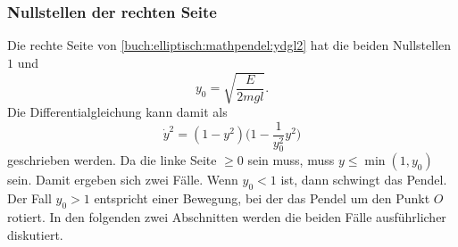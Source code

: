 \subsubsection{Nullstellen der rechten Seite}
Die rechte Seite von \eqref{buch:elliptisch:mathpendel:ydgl2}
hat die beiden Nullstellen $1$ und
\begin{equation}
y_0=\sqrt{\frac{E}{2mgl}}. 
\label{buch:elliptisch:mathpendel:y0}
\end{equation}
Die Differentialgleichung kann damit als
\begin{equation}
\dot{y}^2
=
(1-y^2)\biggl(1-\frac{1}{y_0^2}y^2\biggr)
\label{buch:elliptisch:mathpendel:y0dgl}
\end{equation}
geschrieben werden.
Da die linke Seite $\ge 0$ sein muss, muss 
\(
y\le \min(1,y_0)
\)
sein.
Damit ergeben sich zwei Fälle.
Wenn $y_0<1$ ist, dann schwingt das Pendel.
Der Fall $y_0>1$ entspricht einer Bewegung, bei der das Pendel
um den Punkt $O$ rotiert.
In den folgenden zwei Abschnitten werden die beiden Fälle ausführlicher
diskutiert.


